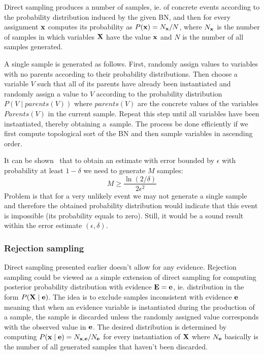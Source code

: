 \documentclass[english,cover]{fitthesis} %
\newcommand{\vars}[1]{{\bold{#1}}}         %
\begin{document}
Direct sampling produces a number of samples, ie. of concrete events according to the probability distribution induced by the given BN, and then for every assignment $\vars{x}$ computes its probability as $P(\vars{x}) = N_\vars{x} / N$, where $N_\vars{x}$ is the number of samples in which variables $\vars{X}$ have the value $\vars{x}$ and $N$ is the number of all samples generated.

A single sample is generated as follows. First, randomly assign values to variables with no parents according to their probability distributions. Then choose a variable $V$ such that all of its parents have already been instantiated and randomly assign a value to $V$ according to the probability distribution $P(V \mid parents(V))$ where $parents(V)$ are the concrete values of the variables $Parents(V)$ in the current sample. Repeat this step until all variables have been instantiated, thereby obtaining a~sample. The process be done efficiently if we first compute topological sort of the BN and then sample variables in ascending order.

It can be shown~\cite[p.~491]{pgm} that to obtain an estimate with error bounded by $\epsilon$ with probability at least $1-\delta$ we need to generate $M$ samples:
\begin{equation*}%
M \geq \frac{\ln(2 / \delta)}{2 \epsilon ^ 2}
\end{equation*}
Problem is that for a very unlikely event we may not generate a single sample and therefore the obtained probability distribution would indicate that this event is impossible (its probability equals to zero). Still, it would be a sound result within the error estimate $(\epsilon, \delta)$.

\subsubsection{Rejection sampling}
Direct sampling presented earlier doesn't allow for any evidence. Rejection sampling could be viewed as a simple extension of direct sampling for computing posterior probability distribution with evidence $\vars{E} = \vars{e}$, ie. distribution in the form $P(\vars{X} \mid \vars{e})$. The idea is to exclude samples inconsistent with evidence $\vars{e}$ meaning that when an evidence variable is instantiated during the production of a sample, the sample is discarded unless the randomly assigned value corresponds with the observed value in $\vars{e}$. The desired distribution is determined by computing $P(\vars{x} \mid \vars{e}) = N_{\vars{x}, \vars{e}} / N_\vars{e}$ for every instantiation of $\vars{X}$ where $N_\vars{e}$ basically is the number of all generated samples that haven't been discarded.
\end{document}
